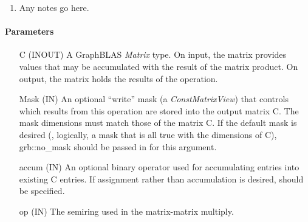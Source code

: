\begin{enumerate}
\item Any notes go here.
\end{enumerate}

\paragraph{Parameters}

\begin{itemize}[leftmargin=1.1in]
    \item[{\sf C}]    ({\sf INOUT}) A GraphBLAS \emph{Matrix} type. On input,
    the matrix provides values that may be accumulated with the result of the
    matrix product.  On output, the matrix holds the results of the
    operation.

    \item[{\sf Mask}] ({\sf IN}) An optional ``write'' mask (a \emph{ConstMatrixView}) that controls which
    results from this operation are stored into the output matrix {\sf C}. The 
    mask dimensions must match those of the matrix {\sf C}. 
    If the default
    mask is desired (\ie, logically, a mask that is all {\sf true} with the dimensions of {\sf C}), 
    {\sf grb::no\_mask} should be passed in for this argument.

    \item[{\sf accum}] ({\sf IN}) An optional binary operator used for accumulating
    entries into existing {\sf C} entries.  If assignment rather than accumulation is
    desired,  should be specified. 

    \item[{\sf op}]   ({\sf IN}) The semiring used in the matrix-matrix
    multiply.


\end{itemize}

